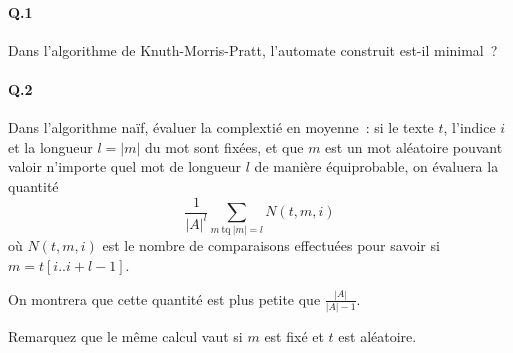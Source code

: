 \documentclass[10pt,a4paper]{article}
\begin{document}
\paragraph{Q.1} Dans l'algorithme de Knuth-Morris-Pratt, l'automate construit 
est-il minimal~?
\paragraph{Q.2} Dans l'algorithme naïf, évaluer la complextié en moyenne~: si 
le texte $t$, l'indice $i$ et la longueur $l=|m|$ du mot sont fixées, et que $m$ 
est un mot aléatoire pouvant valoir n'importe quel mot de longueur $l$ de manière 
équiprobable, on évaluera la quantité
\[\frac1{|A|^l} \sum_{ m \ \mathrm{tq} \ |m| = l} N(t,m,i) \]
où $N(t,m,i)$ est le nombre de comparaisons effectuées pour savoir si 
$m=t[i..i+l-1]$.

On montrera que cette quantité est plus petite que $\frac{|A|}{|A|-1}$.

Remarquez que le même calcul vaut si $m$ est fixé et $t$ est aléatoire.
\end{document}
